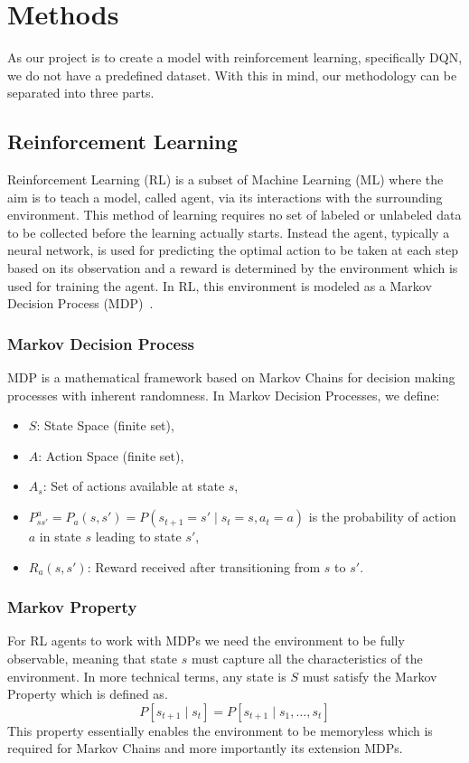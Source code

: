 \section{Methods}
As our project is to create a model with reinforcement learning, specifically DQN,
we do not have a predefined dataset. With this in mind, our methodology can be separated
into three parts.

\subsection{Reinforcement Learning}
Reinforcement Learning (RL) is a subset of Machine Learning (ML) where the
aim is to teach a model, called agent, via its interactions with the surrounding environment.
This method of learning requires no set of labeled or unlabeled data to be collected before
the learning actually starts. Instead the agent, typically a neural network,
is used for predicting the optimal action to be taken at each step based on its observation
and a reward is determined by the environment which is used for training the agent.
In RL, this environment is modeled as a Markov Decision Process (MDP)~\autocite{BUSONIU20188}.

\subsubsection{Markov Decision Process}
MDP is a mathematical framework based on Markov Chains for decision making processes
with inherent randomness. In Markov Decision Processes, we define:
\begin{itemize}
    \item \(S\): State Space (finite set),
    \item \(A\): Action Space (finite set),
    \item \(A_s\): Set of actions available at state \(s\),
    \item
          \(P^a_{ss'} = P_a(s,s') = P(s_{t+1} = s' \;|\; s_t = s, a_t = a)\) is the probability of action \(a\) in state \(s\) leading to state \(s'\),
    \item \(R_a(s, s')\): Reward received after transitioning from \(s\) to \(s'\).
\end{itemize}

\subsubsection{Markov Property}
For RL agents to work with MDPs we need the environment to be fully observable,
meaning that state \(s\) must capture all the characteristics of the environment.
In more technical terms, any state is \(S\) must satisfy the Markov Property which is defined as.
\begin{equation}
    P[s_{t+1} \;|\; s_t] = P[s_{t+1} \;|\; s_1, \ldots, s_t]
\end{equation}
This property essentially enables the environment to be memoryless which is required for
Markov Chains and more importantly its extension MDPs.

